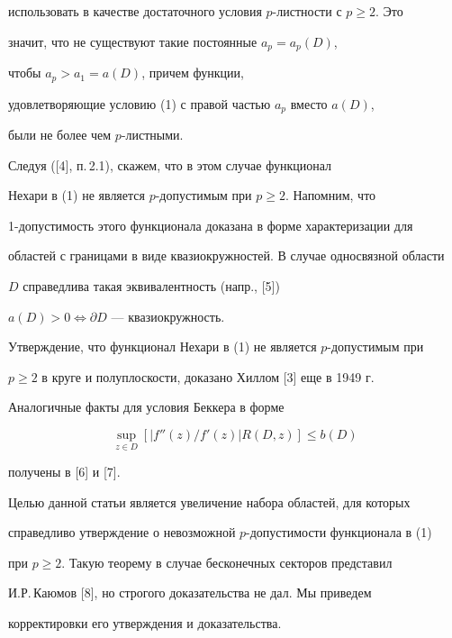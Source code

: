 использовать в качестве достаточного условия $p$-листности с $p \ge 2$. Это 


значит, что не существуют такие постоянные $a_p=a_p (D)$,


чтобы $a_p > a_1=a(D)$, причем функции, 


удовлетворяющие условию (1) с правой частью $a_p$ вместо $a(D)$, 


были не более чем $p$-листными.





Следуя ([4], п.\,2.1), скажем, что в этом случае функционал 


Нехари в (1) не является $p$-до\-пус\-тимым при $p \ge 2$. Напомним, что 


1-допустимость этого функционала доказана в форме характеризации для 


областей с границами в виде квазиокружностей. В случае односвязной области 


$D$ справедлива такая эквивалентность (напр., [5])


$a(D) > 0 \Leftrightarrow \partial D$ --- квазиокружность.





Утверждение, что функционал Нехари в (1) не является $p$-допустимым при


$p \ge 2$ в круге и полуплоскости, доказано Хиллом [3] еще в 1949 г.


Аналогичные факты для условия Беккера в форме


$$


\sup_{z \in D}[{|f''(z)/f'(z)|R({D,z})}] \le b(D)


$$


получены в [6] и [7].





Целью данной статьи является увеличение набора областей, для которых 


справедливо утверждение о невозможной $p$-допустимости функционала в (1)


при $p \ge 2$. Такую теорему в случае бесконечных секторов представил 


И.Р.\,Каюмов [8], но строгого доказательства не дал. Мы приведем 


корректировки его утверждения и доказательства.


\medskip









